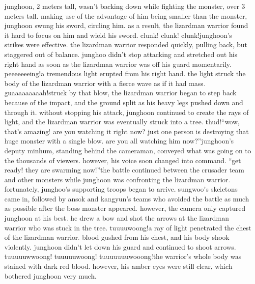 junghoon, 2 meters tall, wasn’t backing down while fighting the monster, over 3 meters tall.
making use of the advantage of him being smaller than the monster, junghoon swung his sword, circling him.
 as a result, the lizardman warrior found it hard to focus on him and wield his sword.
clunk! clunk! clunk!junghoon’s strikes were effective.
 the lizardman warrior responded quickly, pulling back, but staggered out of balance.
 junghoo didn’t stop attacking and stretched out his right hand as soon as the lizardman warrior was off his guard momentarily.
peeeeeeeing!a tremendous light erupted from his right hand.
 the light struck the body of the lizardman warrior with a fierce wave as if it had mass.
guaaaaaaaaah!struck by that blow, the lizardman warrior began to step back because of the impact, and the ground split as his heavy legs pushed down and through it.
 without stopping his attack, junghoon continued to create the rays of light, and the lizardman warrior was eventually struck into a tree.
thud!“wow, that’s amazing! are you watching it right now? just one person is destroying that huge monster with a single blow.
 are you all watching him now?”junghoon’s deputy minhum, standing behind the cameraman, conveyed what was going on to the thousands of viewers.
 however, his voice soon changed into command.
“get ready! they are swarming now!”the battle continued between the crusader team and other monsters while junghoon was confronting the lizardman warrior.
 fortunately, junghoo’s supporting troops began to arrive.
sungwoo’s skeletons came in, followed by ansok and kangyun’s teams who avoided the battle as much as possible after the boss monster appeared.
however, the camera only captured junghoon at his best.
 he drew a bow and shot the arrows at the lizardman warrior who was stuck in the tree.
tuuuuwoong!a ray of light penetrated the chest of the lizardman warrior.
 blood gushed from his chest, and his body shook violently.
 junghoon didn’t let down his guard and continued to shoot arrows.
tuuuuuwwoong! tuuuuuwoong! tuuuuuuuwooong!the warrior’s whole body was stained with dark red blood.
 however, his amber eyes were still clear, which bothered junghoon very much.

